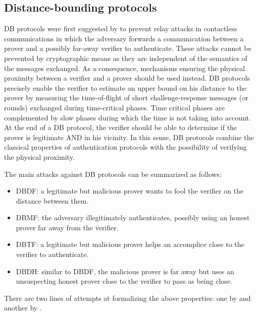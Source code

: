 \subsection{Distance-bounding protocols}%
\label{distance-bounding}

\Ac{DB} protocols were first suggested by \citet{DistanceBounding} to prevent relay attacks in contactless communications in which the adversary forwards a communication between a prover and a possibly far-away verifier to authenticate. 
These attacks cannot be prevented by cryptographic means as they are independent of the semantics of the messages exchanged.
As a consequence, mechanisms ensuring the physical proximity between a verifier and a prover should be used instead.
\Ac{DB} protocols precisely enable the verifier to estimate an upper bound on his distance to the prover by measuring the time-of-flight of short challenge-response messages (or rounds) exchanged during time-critical phases. 
Time critical phases are complemented by slow phases during which the time is not taking into account. 
At the end of a \Ac{DB} protocol, the verifier should be able to determine if the prover is legitimate AND in his vicinity.
In this sense, \Ac{DB} protocols combine the classical properties of authentication protocols with the possibility of verifying the physical proximity.

The main attacks against \ac{DB} protocols can be summarized as follows:
\begin{itemize}
  \item \Acf{DBDF}: a legitimate but malicious prover wants to fool the verifier on the distance between them.
  \item \Acf{DBMF}: the adversary illegitimately authenticates, possibly using an honest prover far away from the verifier.
  \item \Acf{DBTF}: a legitimate but malicious prover helps an accomplice close to the verifier to authenticate.
  \item \Acf{DBDH}: similar to \ac{DBDF}, the malicious prover is far away but 
    uses an unsuspecting honest prover close to the verifier to pass as being 
    close.
\end{itemize}
There are two lines of attempts at formalizing the above properties: one by 
\citet{DB-BMV} and another by \citet{DB-DFKO}.

